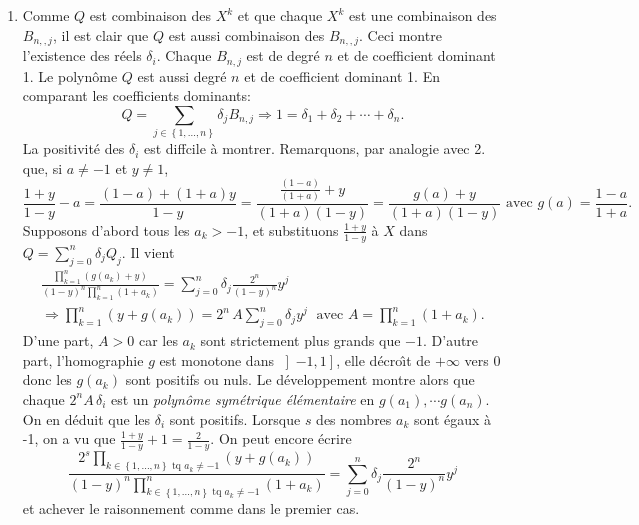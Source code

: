 \begin{enumerate}
\item Comme $Q$ est combinaison des $X^{k}$ et que chaque $X^{k}$ est une combinaison des $B_{n,,j}$, il est clair que $Q$ est aussi combinaison des $B_{n,,j}$. Ceci montre l'existence des r\'{e}els $\delta _{i}$.\newline
Chaque $B_{n,j}$ est de degr\'{e} $n$ et de coefficient dominant 1. Le polyn\^{o}me $Q$ est aussi degr\'{e} $n$ et de coefficient dominant 1. En comparant les coefficients dominants:
\[
Q = \sum_{j\in \left\{1,\ldots ,n\right\} }\delta _{j}B_{n,j} 
\Rightarrow
1 = \delta _{1} + \delta _{2} + \cdots + \delta _{n}.
\]
La positivité des $\delta_i$ est diffcile à montrer.\newline
Remarquons, par analogie avec 2. que, si $a\neq -1$ et $y\neq 1$, 
\[
\frac{1+y}{1-y}-a = \frac{(1-a)+(1+a)y}{1-y} = \frac{\frac{(1-a)}{(1+a)}+y}{(1+a)(1-y)} = \frac{g(a)+y}{(1+a)(1-y)}
\text{ avec } g(a)=\frac{1-a}{1+a}.
\]
Supposons d'abord tous les $a_{k} > -1$, et substituons $\frac{1+y}{1-y}$ \`{a} $X$ dans $Q = \sum_{j=0}^{n}\delta_j Q_j$. Il vient 
\begin{multline*}
\frac{\prod_{k=1}^{n}(g(a_{k}) + y)}{(1-y)^{n}\prod_{k=1}^{n}(1+a_{k})}
 = \sum_{j=0}^{n}\delta _{j}\frac{2^{n}}{(1-y)^{n}}y^{j} \\
\Rightarrow 
 \prod_{k=1}^{n}(y+g(a_{k}))
 = 2^{n}\, A\sum_{j=0}^{n}\delta _{j}y^{j} \; \text{ avec } A = \prod_{k=1}^{n}(1+a_{k}).
\end{multline*}
D'une part,  $A>0$ car les $a_{k}$ sont strictement plus grands que $-1$.\newline
D'autre part, l'homographie $g$ est monotone dans $\left] -1,1\right] $, elle d\'{e}cro\^{\i }t de $+\infty $ vers 0 donc les $g(a_{k})$ sont positifs ou nuls.\newline
Le d\'{e}veloppement montre alors que chaque $2^n A \,\delta_{i}$ est un \emph{polynôme symétrique élémentaire} en $g(a_1), \cdots g(a_n)$. On en déduit que les $\delta_i$ sont positifs.\newline
Lorsque $s$ des nombres $a_{k}$ sont \'{e}gaux \`{a} -1, on a vu que $\frac{1+y}{1-y}+1=\frac{2}{1-y}$.  On peut encore \'{e}crire 
\[
\frac{2^{s}\prod_{k\in \left\{ 1,\ldots ,n\right\} \text{ tq }a_{k}\neq-1}(y+g(a_{k}))}
     {(1-y)^{n}\prod_{k\in \left\{ 1,\ldots ,n\right\} \text{ tq }a_{k}\neq -1}^{n}(1+a_{k})}
   = 
   \sum_{j=0}^{n}\delta _{j}\frac{2^{n}}{(1-y)^{n}}y^{j}
\]
et achever le raisonnement comme dans le premier cas.
\end{enumerate}
